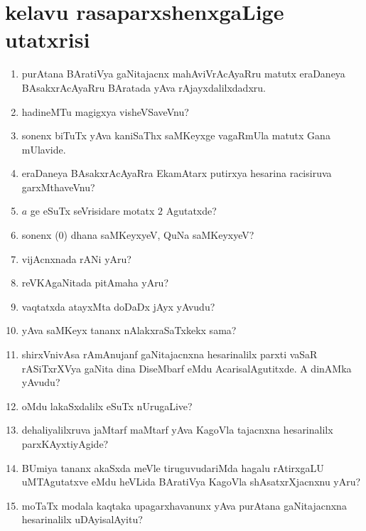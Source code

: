 \chapter{kelavu rasaparxshenxgaLige utatxrisi}\label{chap20}

\begin{enumerate}
  \renewcommand{\labelenumi}{\rm(\theenumi)}
    \itemsep=2pt
\item purAtana BAratiVya gaNitajacnx mahAviVrAcAyaRru matutx eraDaneya BAsakxrAcAyaRru BAratada yAva rAjayxdalilxdadxru.

\item hadineMTu magigxya visheVSaveVnu?

\item sonenx biTuTx yAva kaniSaThx saMKeyxge vagaRmUla matutx Gana mUlavide.

\item eraDaneya BAsakxrAcAyaRra EkamAtarx putirxya hesarina racisiruva garxMthaveVnu?
  
\item $a$ ge eSuTx seVrisidare motatx $2$ Agutatxde?
  
\item sonenx ($0$) dhana saMKeyxyeV, QuNa saMKeyxyeV?
  
\item vijAcnxnada rANi yAru?
  
\item reVKAgaNitada pitAmaha yAru?
   
\item vaqtatxda atayxMta doDaDx jAyx yAvudu?
  
\item yAva saMKeyx tananx nAlakxraSaTxkekx sama?

\item shirxVnivAsa rAmAnujanf gaNitajacnxna hesarinalilx parxti vaSaR rASiTxrXVya gaNita dina DiseMbarf eMdu AcarisalAgutitxde. A dinAMka yAvudu?

\item oMdu lakaSxdalilx eSuTx nUrugaLive?
  
\item dehaliyalilxruva jaMtarf maMtarf yAva KagoVla tajacnxna hesarinalilx parxKAyxti\-yAgide?
  
\item BUmiya tananx akaSxda meVle tiruguvudariMda hagalu rAtirxgaLU uMTAgutatxve eMdu heVLida BAratiVya KagoVla shAsatxrXjacnxnu yAru?
  
\item moTaTx modala kaqtaka upagarxhavanunx yAva purAtana gaNitajacnxna hesarinalilx uDAyisalAyitu?
  

\end{enumerate}
